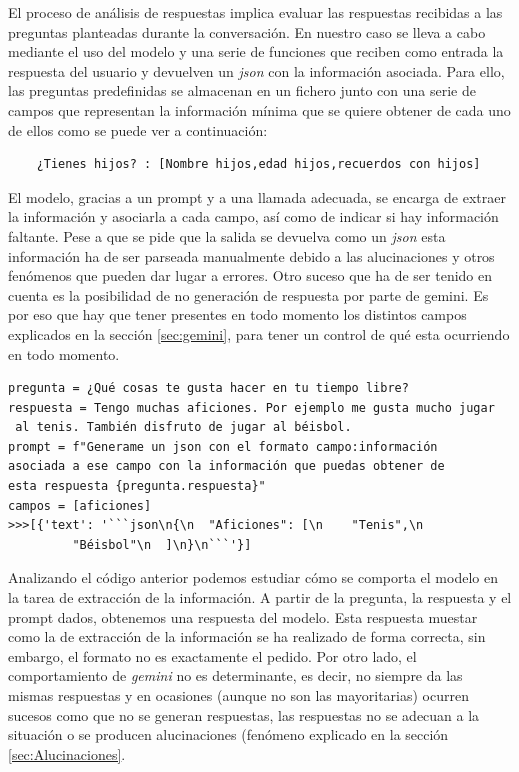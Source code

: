 El proceso de análisis de respuestas implica evaluar las respuestas recibidas a las preguntas planteadas durante la conversación. En nuestro caso se lleva a cabo mediante el uso del modelo y una serie de funciones que reciben como entrada la respuesta del usuario y devuelven un \textit{json} con la información asociada. Para ello, las preguntas predefinidas se almacenan en un fichero junto con una serie de campos que representan la información mínima que se quiere obtener de cada uno de ellos como se puede ver a continuación:
\begin{verbatim}
	¿Tienes hijos? : [Nombre hijos,edad hijos,recuerdos con hijos]
\end{verbatim}

El modelo, gracias a un prompt y a una llamada adecuada, se encarga de extraer la información y asociarla a cada campo, así como de indicar si hay información faltante. Pese a que se pide que la salida se devuelva como un \textit{json} esta información ha de ser parseada manualmente debido a las alucinaciones y otros fenómenos que pueden dar lugar a errores. Otro suceso que ha de ser tenido en cuenta es la posibilidad de no generación de respuesta por parte de gemini. Es por eso que hay que tener presentes en todo momento los distintos campos explicados en la sección \ref{sec:gemini}, para tener un control de qué esta ocurriendo en todo momento. 
\begin{verbatim}
pregunta = ¿Qué cosas te gusta hacer en tu tiempo libre?	
respuesta = Tengo muchas aficiones. Por ejemplo me gusta mucho jugar
 al tenis. También disfruto de jugar al béisbol.
prompt = f"Generame un json con el formato campo:información 
asociada a ese campo con la información que puedas obtener de 
esta respuesta {pregunta.respuesta}"
campos = [aficiones]
>>>[{'text': '```json\n{\n  "Aficiones": [\n    "Tenis",\n   
		 "Béisbol"\n  ]\n}\n```'}]
\end{verbatim}
Analizando el código anterior podemos estudiar cómo se comporta el modelo en la tarea de extracción de la información. A partir de la pregunta, la respuesta y el prompt dados, obtenemos una respuesta del modelo. Esta respuesta muestar como la de extracción de la información se ha realizado de forma correcta, sin embargo, el formato no es exactamente el pedido. Por otro lado, el comportamiento de \textit{gemini} no es determinante, es decir, no siempre da las mismas respuestas y en ocasiones (aunque no son las mayoritarias) ocurren sucesos como que no se generan respuestas, las respuestas no se adecuan a la situación o se producen alucinaciones (fenómeno explicado en la sección \ref{sec:Alucinaciones}. 

